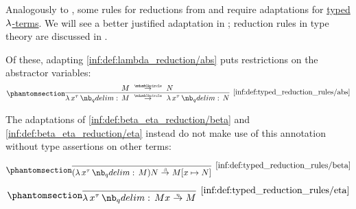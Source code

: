 \begin{definition}\label{def:typed_reduction_rules}
  Analogously to , some rules for reductions from  and  require adaptations for \hyperref[def:typed_lambda_term]{typed \( \mathrm{\lambda} \)-terms}. We will see a better justified adaptation in ; reduction rules in type theory are discussed in .

  Of these, adapting \ref{inf:def:lambda_reduction/abs} puts restrictions on the abstractor variables:
  \begin{equation*}\taglabel[\ensuremath{ \logic{Abs}_{\Anon}^{\T{tt}} }]{inf:def:typed_reduction_rules/abs}
    \begin{prooftree}
      \hypo{ M \pred N }
      \infer1[\ref{inf:def:typed_reduction_rules/abs}]{ \qabs {x^\tau} M \pred \qabs {x^\tau} N }.
    \end{prooftree}
  \end{equation*}

  The adaptations of \ref{inf:def:beta_eta_reduction/beta} and \ref{inf:def:beta_eta_reduction/eta} instead do not make use of this annotation without type assertions on other terms:
  \begin{paracol}{2}
    \begin{leftcolumn}
      \begin{equation*}\taglabel[\ensuremath{ \logic{Red}_\beta^{\T{tt}} }]{inf:def:typed_reduction_rules/beta}
        \begin{prooftree}
          \infer0[\ref{inf:def:typed_reduction_rules/beta}]{ (\qabs {x^\tau} M) N \bred M[x \mapsto N] }.
        \end{prooftree}
      \end{equation*}
    \end{leftcolumn}

    \begin{rightcolumn}
      \begin{equation*}\taglabel[\ensuremath{ \logic{Par}_\eta^{\T{tt}} }]{inf:def:typed_reduction_rules/eta}
        \begin{prooftree}
          \infer0[\ref{inf:def:typed_reduction_rules/eta}]{ \qabs {x^\tau} M x \ered M }.
        \end{prooftree}
      \end{equation*}
    \end{rightcolumn}
  \end{paracol}
\end{definition}

